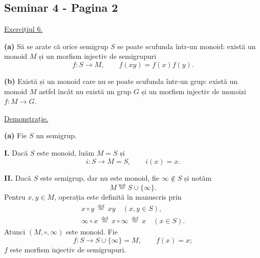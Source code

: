 
\subsection*{Seminar 4 - Pagina 2}

\noindent\underline{Exercițiul 6.}

\noindent\textbf{(a)} Să se arate că orice semigrup $S$ se poate
scufunda într-un monoid: există un monoid $M$ și un morfism injectiv
de semigrupuri
\[
  f:S\longrightarrow M,\qquad f(xy)=f(x)f(y).
\]

\noindent\textbf{(b)} Există și un monoid care nu se poate scufunda
într-un grup: există un monoid $M$ astfel încât nu există un grup $G$
și un morfism injectiv de monoizi $f:M\to G$.

\medskip
\noindent\underline{Demonstrație.}

\noindent\textbf{(a)} Fie $S$ un semigrup.

\smallskip
\noindent\textbf{I.} Dacă $S$ este monoid, luăm $M=S$ și
\[
  i:S\longrightarrow M=S,\qquad i(x)=x.
\]

\noindent\textbf{II.} Dacă $S$ este semigrup, dar nu este monoid,
fie $\infty\notin S$ și notăm
\[
  M\overset{\mathrm{not}}{=}S\cup\{\infty\}.
\]
Pentru $x,y\in M$, operația este definită în manuscris prin
\[
\begin{gathered}
  x\circ y\ \overset{\mathrm{def}}{=}\ xy
     \quad(x,y\in S),\\
  \infty\circ x\ \overset{\mathrm{def}}{=}\
     x\circ\infty\ \overset{\mathrm{def}}{=}\ x
     \quad(x\in S).
\end{gathered}
\]
Atunci $(M,\circ,\infty)$ este monoid. Fie
\[
  f:S\longrightarrow S\cup\{\infty\}=M,\qquad f(x)=x;
\]
$f$ este morfism injectiv de semigrupuri.

